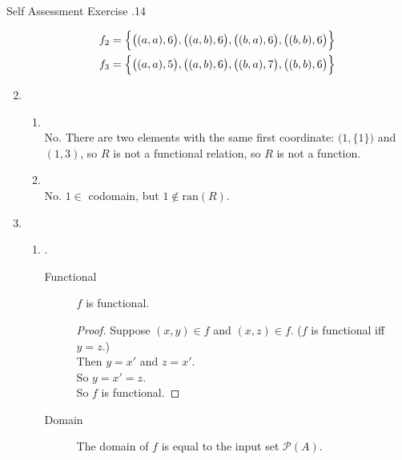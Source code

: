 \documentclass[../notes.tex]{subfiles}
\begin{document}
\begin{exercise}{Self Assessment Exercise \thechapter.14}
\begin{enumerate}
\begin{align*}
								f_{2} &= \Bigl\{\bigl((a, a), 6\bigr), \bigl((a, b), 6\bigr), \bigl((b, a), 6\bigr), \bigl((b, b), 6\bigr)\Bigr\}\\
								f_{3} &= \Bigl\{\bigl((a, a), 5\bigr), \bigl((a, b), 6\bigr), \bigl((b, a), 7\bigr), \bigl((b, b), 6\bigr)\Bigr\}
							\end{align*}
						\item {}
							\begin{enumerate}[label=(\alph*)]
								\item {}\\
									No. There are two elements with the same first coordinate: $\bigl(1, \{1\}\bigr)$ and $(1, 3)$, so $R$ is not a functional relation, so $R$ is not a function.
								\item {}\\
									No. $1 \in$ codomain, but $1 \notin \mathrm{ran}(R)$.
							\end{enumerate}
						\pagebreak
						\item {}
							\begin{enumerate}[label=(\alph*)]
								\item {}.
									\begin{description}
										\item[Functional] $f$ is functional.
											\begin{proof}
												Suppose $(x, y) \in f$ and $(x, z) \in f$. ($f$ is functional iff $y = z$.)\\
												Then $y = x'$ and $z = x'$.\\
												So $y = x' = z$.\\
												So $f$ is functional.
											\end{proof}
										\item[Domain] The domain of $f$ is equal to the input set $\mathcal{P}(A)$.

\end{description}
\end{enumerate}
\end{enumerate}
\end{exercise}
\end{document}
